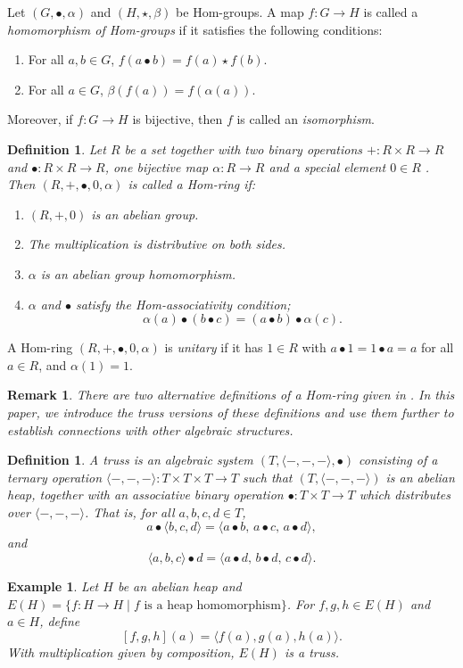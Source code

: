 \documentclass[14pt]{article}
\theoremstyle{Definition}
\newtheorem{Def}[thm]{Definition}
\newtheorem{Rem}[thm]{Remark}
\newtheorem{Exam}[thm]{Example}
\theoremstyle{remark}
\begin{document}
Let $(G,\bullet,\alpha)$ and $(H,\star,\beta)$ be Hom-groups.  
A map $f: G \rightarrow H$ is called a \emph{homomorphism of Hom-groups} if it satisfies the following conditions: 
\begin{enumerate}
\item[(1)] For all $a,b \in G$, 
$f(a \bullet b) = f(a) \star f(b)$.
\item[(2)] For all $a \in G$, $\beta(f(a)) = f(\alpha(a))$.

\end{enumerate}
Moreover, if $f:G \rightarrow H$ is bijective, then $f$ is called an \emph{isomorphism}.

\begin{Def}\cite{Fre}
Let $R$ be a set together with two binary operations $+:R\times R\rightarrow R$ and $\bullet:R\times R\rightarrow R$, one bijective map $\alpha:R\rightarrow R$ and a special element    $0\in R$ . Then $(R,+,\bullet,0, \alpha)$ is called a Hom-ring if:
\begin{enumerate}
\item[(i)]$(R,+,0)$ is an abelian group.
\item[(ii)] The multiplication is distributive on both sides.
\item[(iii)] $\alpha$ is an abelian group homomorphism.
\item[(iv)] $\alpha$ and $\bullet$ satisfy the Hom-associativity condition; 
$$\alpha(a)\bullet(b\bullet c)=(a\bullet b)\bullet \alpha(c).$$
\end{enumerate}
\end{Def}

A Hom-ring $(R,+,\bullet, 0, \alpha)$ is \emph{unitary} if it has $1\in R$ with  
$a\bullet 1=1\bullet a= a$ for all $a\in R$, and $\alpha(1)=1$.

\begin{Rem}
There are two alternative definitions of a Hom-ring given in \cite{Ime}. In this paper, we introduce the truss versions of these definitions and use them further to establish connections with other algebraic structures.
\end{Rem}

\begin{Def}\cite{Br}
A \emph{truss} is an algebraic system $(T,\langle -,-,- \rangle,\bullet)$ consisting of a ternary operation 
$\langle -,-,- \rangle:T\times T\times T \to T$ such that $(T,\langle -,-,- \rangle)$ is an abelian heap, 
together with an associative binary operation $\bullet:T\times T \to T$ which distributes over 
$\langle -,-,- \rangle$. That is, for all $a,b,c,d \in T$,
\[
a\bullet \langle b,c,d\rangle=\langle a\bullet b,\,a\bullet c,\,a\bullet d\rangle,
\]
and
\[
\langle a,b,c\rangle \bullet d=\langle a\bullet d,\,b\bullet d,\,c\bullet d\rangle.
\]
\end{Def}
\begin{Exam}
Let $H$ be an abelian heap and $E(H)=\{f:H\to H\mid f \text{ is a heap homomorphism}\}$. For $f,g,h\in E(H)$ and $a\in H$, define 
\[
[f,g,h](a)=\langle f(a),g(a),h(a)\rangle.
\] 
With multiplication given by composition, $E(H)$ is a truss.
\end{Exam}
\end{document}
